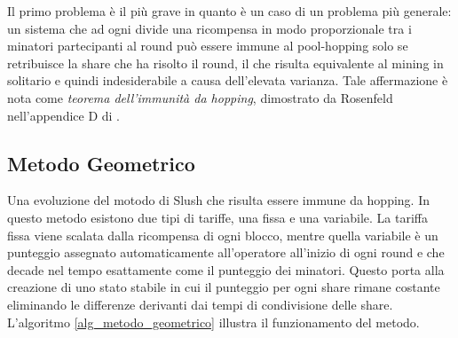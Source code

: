Il primo problema è il più grave in quanto è un caso di un problema più generale: un sistema che ad ogni divide una ricompensa in modo proporzionale tra i minatori partecipanti al round può essere immune al pool-hopping solo se retribuisce la share che ha risolto il round, il che risulta equivalente al mining in solitario e quindi indesiderabile a causa dell'elevata varianza. Tale affermazione è nota come \emph{teorema dell'immunità da hopping}, dimostrato da Rosenfeld nell'appendice D di \cite{pool-analysis}.

\subsection{Metodo Geometrico}

Una evoluzione del motodo di Slush che risulta essere immune da hopping.
In questo metodo esistono due tipi di tariffe, una fissa e una variabile. La tariffa fissa viene scalata dalla ricompensa di ogni blocco, mentre quella variabile è un punteggio assegnato automaticamente all'operatore all'inizio di ogni round e che decade nel tempo esattamente come il punteggio dei minatori.
Questo porta alla creazione di uno stato stabile in cui il punteggio per ogni share rimane costante eliminando le differenze derivanti dai tempi di condivisione delle share. L'algoritmo \ref{alg_metodo_geometrico} illustra il funzionamento del metodo.




